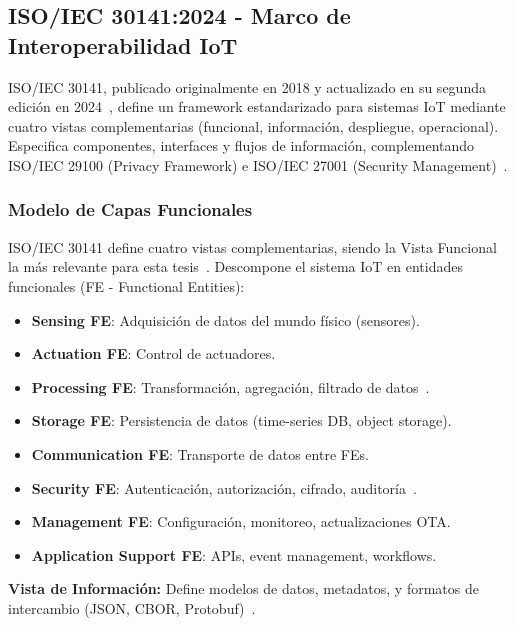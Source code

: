 \subsection{ISO/IEC 30141:2024 - Marco de Interoperabilidad IoT}

ISO/IEC 30141, publicado originalmente en 2018 y actualizado en su segunda edición en 2024~\cite{ISOIEC30141v2024}, define un framework estandarizado para sistemas IoT mediante cuatro vistas complementarias (funcional, información, despliegue, operacional). Especifica componentes, interfaces y flujos de información, complementando ISO/IEC 29100 (Privacy Framework) e ISO/IEC 27001 (Security Management)~\cite{ISOIEC30141v2024,tangResearchInteroperabilityIoT}.

\subsubsection{Modelo de Capas Funcionales}

ISO/IEC 30141 define cuatro vistas complementarias, siendo la Vista Funcional la más relevante para esta tesis~\cite{tangResearchInteroperabilityIoT}. Descompone el sistema IoT en entidades funcionales (FE - Functional Entities):

\begin{itemize}
\item \textbf{Sensing FE}: Adquisición de datos del mundo físico (sensores).
\item \textbf{Actuation FE}: Control de actuadores.
\item \textbf{Processing FE}: Transformación, agregación, filtrado de datos~\cite{choudharyInternetThingsComprehensive2024}.
\item \textbf{Storage FE}: Persistencia de datos (time-series DB, object storage).
\item \textbf{Communication FE}: Transporte de datos entre FEs.
\item \textbf{Security FE}: Autenticación, autorización, cifrado, auditoría~\cite{alsuwaidiSecuringSmartGrid2024}.
\item \textbf{Management FE}: Configuración, monitoreo, actualizaciones OTA.
\item \textbf{Application Support FE}: APIs, event management, workflows.
\end{itemize}

\textbf{Vista de Información:} Define modelos de datos, metadatos, y formatos de intercambio (JSON, CBOR, Protobuf)~\cite{tangResearchInteroperabilityIoT}.

